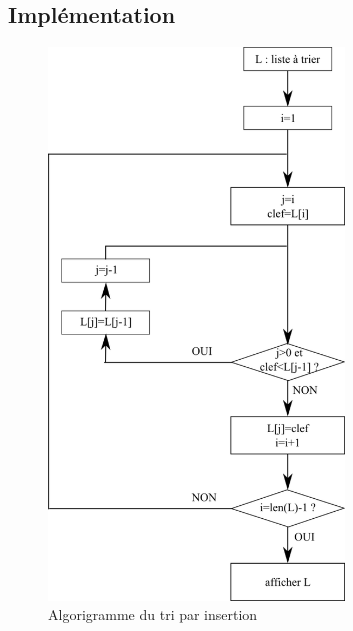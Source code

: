 \subsection{Implémentation}


\begin{figure}[!htb]
\begin{minipage}{0.5\textwidth}
\begin{algorithm}[H]
{}
\end{algorithm}
\end{minipage}
\begin{minipage}{0.5\textwidth}
\begin{center}
\includegraphics[width=0.7\textwidth]{images/algorigramme_insertion}
\caption{Algorigramme du tri par insertion}
\end{center}
\end{minipage}
\end{figure}



